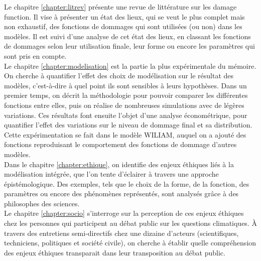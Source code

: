 Le chapitre \ref{chapter:litrev} présente une revue de littérature sur les \gls{damage function}. Il vise à présenter un état des lieux, qui se veut le plus complet mais non exhaustif, des fonctions de dommages qui sont utilisées (ou non) dans les modèles. Il est suivi d'une analyse de cet état des lieux, en classant les fonctions de dommages selon leur utilisation finale, leur forme ou encore les paramètres qui sont pris en compte. \\

Le chapitre \ref{chapter:modelisation} est la partie la plus expérimentale du mémoire. On cherche à quantifier l'effet des choix de modélisation sur le résultat des modèles, c'est-à-dire à quel point ils sont sensibles à leurs hypothèses. Dans un premier temps, on décrit la méthodologie pour pouvoir comparer les différentes fonctions entre elles, puis on réalise de nombreuses simulations avec de légères variations. Ces résultats font ensuite l'objet d'une analyse économétrique, pour quantifier l'effet des variations sur le niveau de dommage final et sa distribution. Cette expérimentation se fait dans le modèle \Gls{WILIAM}, auquel on a ajouté des fonctions reproduisant le comportement des fonctions de dommage d'autres modèles. \\

Dans le chapitre \ref{chapter:ethique}, on identifie des enjeux éthiques liés à la modélisation intégrée, que l'on tente d'éclairer à travers une approche épistémologique. Des exemples, tels que le choix de la forme, de la fonction, des paramètres ou encore des phénomènes représentés, sont analysés grâce à des philosophes des sciences. \\


Le chapitre \ref{chapter:socio} s'interroge sur la perception de ces enjeux éthiques chez les personnes qui participent au débat public sur les questions climatiques. À travers des entretiens semi-directifs chez une dizaine d'acteurs (scientifiques, techniciens, politiques et société civile), on cherche à établir quelle compréhension des enjeux éthiques transparait dans leur transposition au débat public. 

